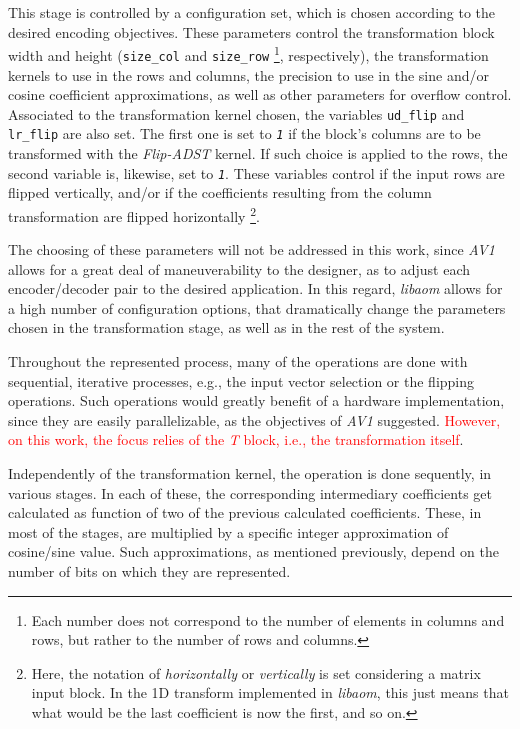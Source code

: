 This stage is controlled by a configuration set, which is chosen according to the desired encoding objectives. These parameters control the transformation block width and height (\texttt{size\_col} and \texttt{size\_row} \footnote{Each number does not correspond to the number of elements in columns and rows, but rather to the number of rows and columns.}, respectively), the transformation kernels to use in the rows and columns, the precision to use in the sine and/or cosine coefficient approximations, as well as other parameters for overflow control. Associated to the transformation kernel chosen, the variables \texttt{ud\_flip} and \texttt{lr\_flip} are also set. The first one is set to \emph{\texttt{1}} if the block's columns are to be transformed with the \emph{Flip-ADST} kernel. If such choice is applied to the rows, the second variable is, likewise, set to \emph{\texttt{1}}. These variables control if the input rows are flipped vertically, and/or if the coefficients resulting from the column transformation are flipped horizontally \footnote{Here, the notation of \emph{horizontally} or \emph{vertically} is set considering a matrix input block. In the 1D transform implemented in \emph{libaom}, this just means that what would be the last coefficient is now the first, and so on.}.

The choosing of these parameters will not be addressed in this work, since \emph{AV1} allows for a great deal of maneuverability to the designer, as to adjust each encoder/decoder pair to the desired application. In this regard, \emph{libaom} allows for a high number of configuration options, that dramatically change the parameters chosen in the transformation stage, as well as in the rest of the system.

Throughout the represented process, many of the operations are done with sequential, iterative processes, e.g., the input vector selection or the flipping operations. Such operations would greatly benefit of a hardware implementation, since they are easily parallelizable, as the objectives of \emph{AV1} suggested. \textcolor{red}{However, on this work, the focus relies of the \emph{T} block, i.e., the transformation itself}.

Independently of the transformation kernel, the operation is done sequently, in various stages. In each of these, the corresponding intermediary coefficients get calculated as function of two of the previous calculated coefficients. These, in most of the stages, are multiplied by a specific integer approximation of cosine/sine value. Such approximations, as mentioned previously, depend on the number of bits on which they are represented. 

